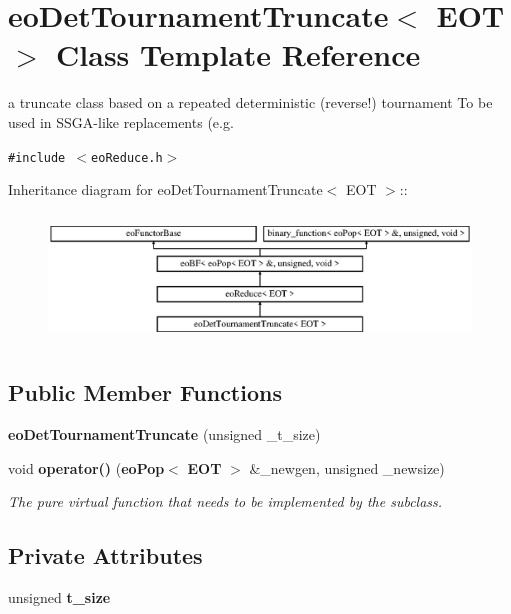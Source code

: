 \section{eo\-Det\-Tournament\-Truncate$<$ EOT $>$ Class Template Reference}
\label{classeo_det_tournament_truncate}
a truncate class based on a repeated deterministic (reverse!) tournament To be used in SSGA-like replacements (e.g.  


{\tt \#include $<$eo\-Reduce.h$>$}

Inheritance diagram for eo\-Det\-Tournament\-Truncate$<$ EOT $>$::\begin{figure}[H]
\begin{center}
\leavevmode
\includegraphics[height=3.45679cm]{classeo_det_tournament_truncate}
\end{center}
\end{figure}
\subsection*{Public Member Functions}
\begin{CompactItemize}
\item 
{\bf eo\-Det\-Tournament\-Truncate} (unsigned \_\-t\_\-size)\label{classeo_det_tournament_truncate_a0}

\item 
void {\bf operator()} ({\bf eo\-Pop}$<$ {\bf EOT} $>$ \&\_\-newgen, unsigned \_\-newsize)\label{classeo_det_tournament_truncate_a1}

\begin{CompactList}\small\item\em The pure virtual function that needs to be implemented by the subclass. \item\end{CompactList}\end{CompactItemize}
\subsection*{Private Attributes}
\begin{CompactItemize}
\item 
unsigned {\bf t\_\-size}\label{classeo_det_tournament_truncate_r0}

\end{CompactItemize}


